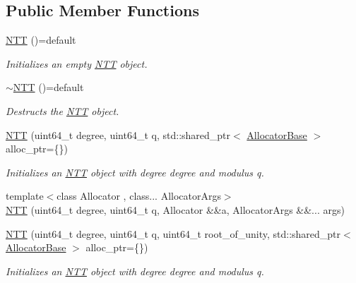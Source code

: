\subsection*{Public Member Functions}
\begin{DoxyCompactItemize}
\item 
\hyperlink{classintel_1_1hexl_1_1NTT_ad31a184065b07b50c3ff01260f6dad28}{N\+TT} ()=default
\begin{DoxyCompactList}\small\item\em Initializes an empty \hyperlink{classintel_1_1hexl_1_1NTT}{N\+TT} object. \end{DoxyCompactList}\item 
\hyperlink{classintel_1_1hexl_1_1NTT_a4fbb886db7389f6a5bac264a3e0cf66f}{$\sim$\+N\+TT} ()=default
\begin{DoxyCompactList}\small\item\em Destructs the \hyperlink{classintel_1_1hexl_1_1NTT}{N\+TT} object. \end{DoxyCompactList}\item 
\hyperlink{classintel_1_1hexl_1_1NTT_a7a86355beefbe191d0e77618eeaaf6b7}{N\+TT} (uint64\+\_\+t degree, uint64\+\_\+t q, std\+::shared\+\_\+ptr$<$ \hyperlink{structintel_1_1hexl_1_1AllocatorBase}{Allocator\+Base} $>$ alloc\+\_\+ptr=\{\})
\begin{DoxyCompactList}\small\item\em Initializes an \hyperlink{classintel_1_1hexl_1_1NTT}{N\+TT} object with degree {\ttfamily degree} and modulus {\ttfamily q}. \end{DoxyCompactList}\item 
{\footnotesize template$<$class Allocator , class... Allocator\+Args$>$ }\\\hyperlink{classintel_1_1hexl_1_1NTT_a716fd07255e9b68fec80e2a9b98841f4}{N\+TT} (uint64\+\_\+t degree, uint64\+\_\+t q, Allocator \&\&a, Allocator\+Args \&\&... args)
\item 
\hyperlink{classintel_1_1hexl_1_1NTT_ac5ef577bf39789c1e200b7d5a7b65989}{N\+TT} (uint64\+\_\+t degree, uint64\+\_\+t q, uint64\+\_\+t root\+\_\+of\+\_\+unity, std\+::shared\+\_\+ptr$<$ \hyperlink{structintel_1_1hexl_1_1AllocatorBase}{Allocator\+Base} $>$ alloc\+\_\+ptr=\{\})
\begin{DoxyCompactList}\small\item\em Initializes an \hyperlink{classintel_1_1hexl_1_1NTT}{N\+TT} object with degree {\ttfamily degree} and modulus {\ttfamily q}. \end{DoxyCompactList}\item 

\end{DoxyCompactItemize}

